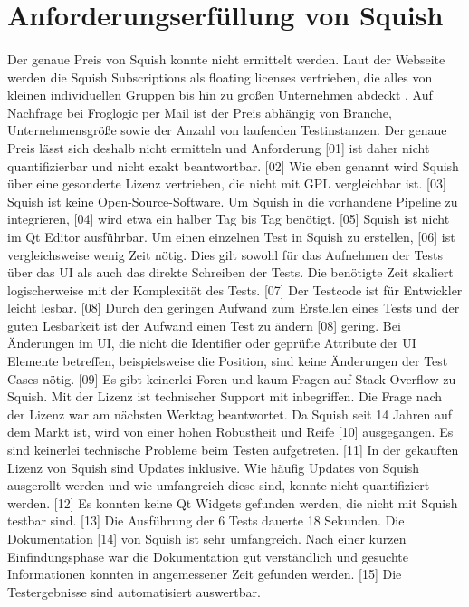 	\section{Anforderungserfüllung von Squish}
	\paragraph{}Der genaue Preis von Squish konnte nicht ermittelt werden. Laut der Webseite werden die Squish Subscriptions als floating licenses vertrieben, die alles von kleinen individuellen Gruppen bis hin zu großen Unternehmen abdeckt \cite{SquishPrice}. Auf Nachfrage bei Froglogic per Mail ist der Preis abhängig von Branche, Unternehmensgröße sowie der Anzahl von laufenden Testinstanzen. Der genaue Preis lässt sich deshalb nicht ermitteln und Anforderung [01] ist daher nicht quantifizierbar und nicht exakt beantwortbar. [02] Wie eben genannt wird Squish über eine gesonderte Lizenz vertrieben, die nicht mit GPL vergleichbar ist. [03] Squish ist keine Open-Source-Software. Um Squish in die vorhandene Pipeline zu integrieren, [04] wird etwa ein halber Tag bis Tag benötigt. [05] Squish ist nicht im Qt Editor ausführbar. Um einen einzelnen Test in Squish zu erstellen, [06] ist vergleichsweise wenig Zeit nötig. Dies gilt sowohl für das Aufnehmen der Tests über das UI als auch das direkte Schreiben der Tests. Die benötigte Zeit skaliert logischerweise mit der Komplexität des Tests. [07] Der Testcode ist für Entwickler leicht lesbar. [08] Durch den geringen Aufwand zum Erstellen eines Tests und der guten Lesbarkeit ist der Aufwand einen Test zu ändern [08] gering. Bei Änderungen im UI, die nicht die Identifier oder geprüfte Attribute der UI Elemente betreffen, beispielsweise die Position, sind keine Änderungen der Test Cases nötig. [09] Es gibt keinerlei Foren und kaum Fragen auf Stack Overflow zu Squish. Mit der Lizenz ist technischer Support mit inbegriffen. Die Frage nach der Lizenz war am nächsten Werktag beantwortet. Da Squish seit 14 Jahren auf dem Markt ist, wird von einer hohen Robustheit und Reife [10] ausgegangen. Es sind keinerlei technische Probleme beim Testen aufgetreten. [11] In der gekauften Lizenz von Squish sind Updates inklusive. Wie häufig Updates von Squish ausgerollt werden und wie umfangreich diese sind, konnte nicht quantifiziert werden. [12] Es konnten keine Qt Widgets gefunden werden, die nicht mit Squish testbar sind. [13] Die Ausführung der 6 Tests dauerte 18 Sekunden. Die Dokumentation [14] von Squish ist sehr umfangreich. Nach einer kurzen Einfindungsphase war die Dokumentation gut verständlich und gesuchte Informationen konnten in angemessener Zeit gefunden werden. [15] Die Testergebnisse sind automatisiert auswertbar.
